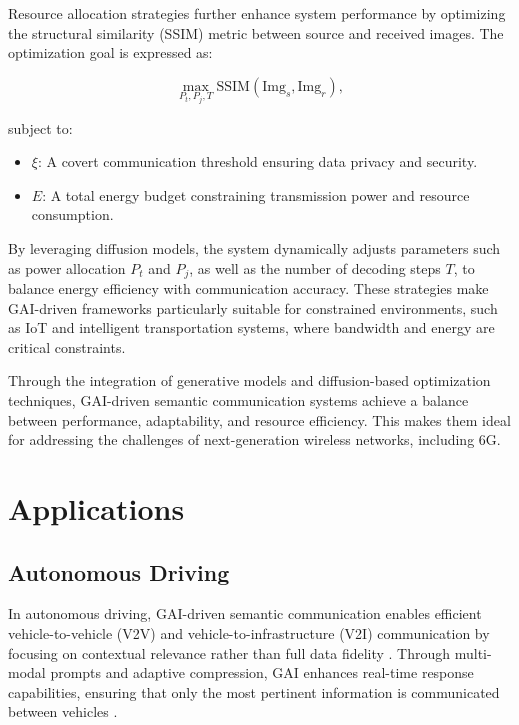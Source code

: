 \documentclass[journal]{IEEEtran}
\begin{document}
Resource allocation strategies further enhance system performance by optimizing the structural similarity (SSIM) metric between source and received images. The optimization goal is expressed as:

\begin{equation}
\max_{P_t, P_j, T} \text{SSIM}(\text{Img}_s, \text{Img}_r),
\end{equation}

subject to:
\begin{itemize}
    \item \( \xi \): A covert communication threshold ensuring data privacy and security.
    \item \( E \): A total energy budget constraining transmission power and resource consumption.
\end{itemize}

By leveraging diffusion models, the system dynamically adjusts parameters such as power allocation \( P_t \) and \( P_j \), as well as the number of decoding steps \( T \), to balance energy efficiency with communication accuracy. These strategies make GAI-driven frameworks particularly suitable for constrained environments, such as IoT and intelligent transportation systems, where bandwidth and energy are critical constraints.

Through the integration of generative models and diffusion-based optimization techniques, GAI-driven semantic communication systems achieve a balance between performance, adaptability, and resource efficiency. This makes them ideal for addressing the challenges of next-generation wireless networks, including 6G.


\section{Applications}

\subsection{Autonomous Driving}
In autonomous driving, GAI-driven semantic communication enables efficient vehicle-to-vehicle (V2V) and vehicle-to-infrastructure (V2I) communication by focusing on contextual relevance rather than full data fidelity \cite{raha2023generativeaidrivensemanticcommunication}. Through multi-modal prompts and adaptive compression, GAI enhances real-time response capabilities, ensuring that only the most pertinent information is communicated between vehicles \cite{10447237}.
\end{document}

